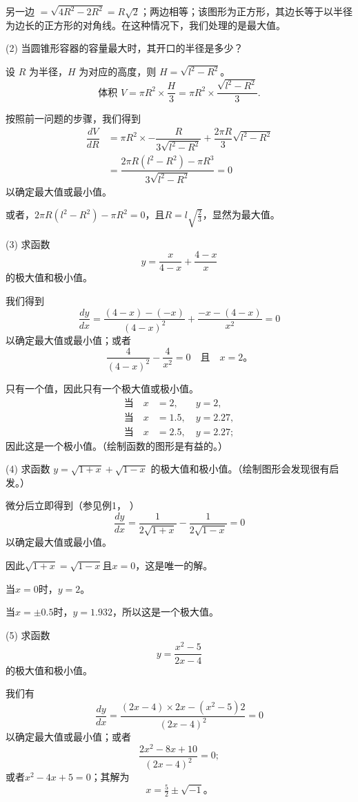 \documentclass{ctexbook}
\newcommand{\DPPageSep}[2]{\Pagelabel{#2}}
\newcommand{\Pagelabel}[1]
  {\phantomsection\label{#1}}
\newcommand{\Pageref}[2][p.]{%
  \ifthenelse{\not\equal{#1}{}}{%
    \hyperref[#2]{#1~\pageref{#2}}%
  }{%
    \hyperref[#2]{\pageref{#2}}%
  }%
}
\newcommand{\DPtypo}[2]{#2}%
\begin{document}
另一边 ${} = \sqrt{4R^2 - 2R^2} = R\sqrt{2}$；两边相等；该图形为正方形，其边长等于以半径为边长的正方形的对角线。在这种情况下，我们处理的是最大值。

(2) 当圆锥形容器的容量最大时，其开口的半径是多少？

设 $R$ 为半径，$H$ 为对应的高度，则 $H = \sqrt{l^2 - R^2}$。
\[
\text{体积 } V = \pi R^2 × \dfrac{H}{3} = \pi R^2 × \dfrac{\sqrt{l^2 - R^2}}{3}.
\]

按照前一问题的步骤，我们得到
\begin{align*}
\dfrac{dV}{dR}
  &= \pi R^2 × -\dfrac{R}{3\sqrt{l^2 - R^2}} + \dfrac{2\pi R}{3} \sqrt{l^2 - R^2} \\
  &= \dfrac{2\pi R(l^2 - R^2) - \pi R^3}{3\sqrt{l^2 - R^2}} = 0
\end{align*}
以确定最大值或最小值。

或者，$2\pi R(l^2 - R^2) - \pi R^2 = 0$，且$R = l\sqrt{\tfrac{2}{3}}$，显然为最大值。
\DPPageSep{118.png}{106}%

(3) 求函数
\[
y = \dfrac{x}{4-x} + \dfrac{4-x}{x}
\]
的极大值和极小值。

我们得到
\[
\dfrac{dy}{dx} = \dfrac{(4-x)-(-x)}{(4-x)^2} + \dfrac{-x - (4-x)}{x^2} = 0
\]
以确定最大值或最小值；或者
\[
\dfrac{4}{(4-x)^2} - \dfrac{4}{x^2} = 0 \quad\text{且}\quad x = 2。
\]

只有一个值，因此只有一个极大值或极小值。
\begin{align*}
\text{当}\quad x &= 2,\phantom{.5}\quad y = 2, \\
\text{当}\quad x &= 1.5,\quad y = 2.27,   \\
\text{当}\quad x &= 2.5,\quad y = 2.27;
\end{align*}
因此这是一个极小值。（绘制函数的图形是有益的。）

(4) 求函数
$y = \sqrt{1+x} + \sqrt{1-x}$
的极大值和极小值。（绘制图形会发现很有启发。）

微分后立即得到（参见例1，\Pageref{ExNo1}）
\[
\dfrac{dy}{dx} = \dfrac{1}{2\sqrt{1+x}} - \dfrac{1}{2\sqrt{1-x}} = 0
\]
以确定最大值或最小值。

因此$\sqrt{1+x} = \sqrt{1-x}$且$x = 0$，这是唯一的解。

当$x=0$时，$y=2$。

当$x=±0.5$时，$y= 1.932$，所以这是一个极大值。
\DPPageSep{119.png}{107}%

(5) 求函数
\[
y = \dfrac{x^2-5}{2x-4}
\]
的极大值和极小值。

我们有
\[
\dfrac{dy}{dx} = \dfrac{(2x-4) × 2x - (x^2-5)2}{(2x-4)^2} = 0
\]
以确定最大值或最小值；或者
\[
\dfrac{2x^2 - 8x + 10}{\DPtypo{(2x - 5)^2}{(2x - 4)^2}} = 0;
\]
或者$x^2 - 4x + 5 = 0$；其解为
\[
x = \tfrac{5}{2} ± \sqrt{-1}。
\]
\end{document}
